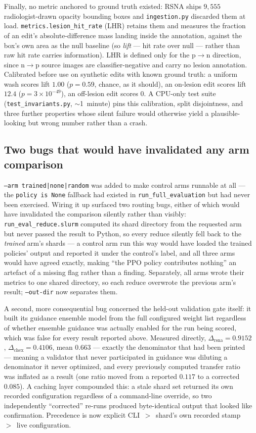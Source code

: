 \documentclass[11pt]{article}
\begin{document}
Finally, no metric anchored to ground truth existed: RSNA ships $9{,}555$
radiologist-drawn opacity bounding boxes and \texttt{ingestion.py} discarded
them at load. \texttt{metrics.lesion\_hit\_rate} (LHR) retains them and
measures the fraction of an edit's absolute-difference mass landing inside
the annotation, against the box's own area as the null baseline (so
\emph{lift} — hit rate over null — rather than raw hit rate carries
information). LHR is defined only for the p$\to$n direction, since
n$\to$p source images are classifier-negative and carry no lesion
annotation. Calibrated before use on synthetic edits with known ground
truth: a uniform wash scores lift $1.00$ ($p=0.59$, chance, as it should),
an on-lesion edit scores lift $12.4$ ($p=3\times10^{-49}$), an off-lesion
edit scores $0$. A CPU-only test suite (\texttt{test\_invariants.py},
$\sim$1~minute) pins this calibration, split disjointness, and three
further properties whose silent failure would otherwise yield a
plausible-looking but wrong number rather than a crash.

\subsection{Two bugs that would have invalidated any arm comparison}
\label{sec:integrity_bugs}

\texttt{--arm trained|none|random} was added to make control arms runnable
at all — the \texttt{policy is None} fallback had existed in
\texttt{run\_full\_evaluation} but had never been exercised. Wiring it up
surfaced two routing bugs, either of which would have invalidated the
comparison silently rather than visibly: \texttt{run\_eval\_reduce.slurm}
computed its shard directory from the requested arm but never passed the
result to Python, so every reduce silently fell back to the \emph{trained}
arm's shards — a control arm run this way would have loaded the trained
policies' output and reported it under the control's label, and all three
arms would have agreed exactly, making ``the PPO policy contributes
nothing'' an artefact of a missing flag rather than a finding. Separately,
all arms wrote their metrics to one shared directory, so each reduce
overwrote the previous arm's result; \texttt{--out-dir} now separates them.

A second, more consequential bug concerned the held-out validation gate
itself: it built its guidance ensemble model from the full configured
weight list regardless of whether ensemble guidance was actually enabled
for the run being scored, which was false for every result reported above.
Measured directly, $\Delta_{\text{rsna}}=0.9152$, $\Delta_{\text{chex}}=
0.4106$, mean $0.663$ — exactly the denominator that had been printed —
meaning a validator that never participated in guidance was diluting a
denominator it never optimized, and every previously computed transfer
ratio was inflated as a result (one ratio moved from a reported $0.117$ to
a corrected $0.085$). A caching layer compounded this: a stale shard set
returned its own recorded configuration regardless of a command-line
override, so two independently ``corrected'' re-runs produced
byte-identical output that looked like confirmation. Precedence is now
explicit CLI~$>$~shard's own recorded stamp~$>$~live configuration.
\end{document}
